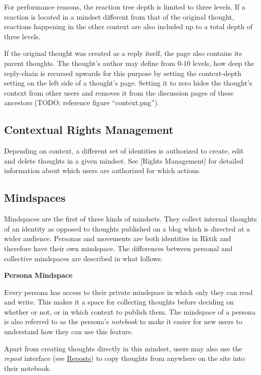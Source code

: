 For performance reasons, the reaction tree depth is limited to three
levels. If a reaction is located in a mindset different from that of the
original thought, reactions happening in the other context are also
included up to a total depth of three levels.

If the original thought was created as a reply itself, the page also
contains its parent thoughts. The thought's author may define from 0-10
levels, how deep the reply-chain is recursed upwards for this purpose by
setting the context-depth setting on the left side of a thought's page.
Setting it to zero hides the thought's context from other users and
removes it from the discussion pages of these ancestors (TODO: reference
figure ``context.png'').

\subsection{Contextual Rights
Management}\label{contextual-rights-management}

Depending on context, a different set of identities is authorized to
create, edit and delete thoughts in a given mindset. See {[}Rights
Management{]} for detailed information about which users are authorized
for which actions.

\subsection{Mindspaces}\label{mindspaces}

Mindspaces are the first of three kinds of mindsets. They collect
internal thoughts of an identity as opposed to thoughts published on a
blog which is directed at a wider audience. Personas and movements are
both identities in Rktik and therefore have their own mindspace. The
differences between personal and collective mindspaces are described in
what follows.

\textbf{Persona Mindspace}

Every persona has access to their private mindspace in which only they
can read and write. This makes it a space for collecting thoughts before
deciding on whether or not, or in which context to publish them. The
mindspace of a persona is also referred to as the persona's
\emph{notebook} to make it easier for new users to understand how they
can use this feature.

Apart from creating thoughts directly in this mindset, users may also
use the \emph{repost} interface (see \hyperref[reposts]{Reposts}) to
copy thoughts from anywhere on the site into their notebook.


